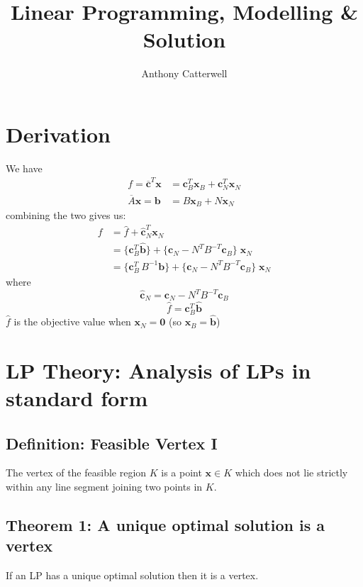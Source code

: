 \documentclass[11pt,a4paper]{article}
\title{Linear Programming, Modelling \& Solution}
\author{Anthony Catterwell}
\begin{document}
\maketitle


\section*{Derivation}
We have
\begin{align*}{}
    f = \overline{\textbf{c}}^{T}\textbf{x} &=
    \textbf{c}_B^T \textbf{x}_B + \textbf{c}_N^T \textbf{x}_N \\
    \overline{A}\textbf{x} = \textbf{b} &= B\textbf{x}_B + N\textbf{x}_N
\end{align*}
combining the two gives us:
\begin{align*}{}
    f &= \widehat{f} + \widehat{\textbf{c}}_N^T \textbf{x}_N \\
      &= \{ \textbf{c}^T_B \widehat{\textbf{b}} \} +
      \{ \textbf{c}_N - N^T B^{-T} \textbf{c}_B \} \; \textbf{x}_N \\
      &= \{ \textbf{c}_B^T \, B^{-1}\textbf{b} \} +
      \{ \textbf{c}_N - N^T B^{-T} \textbf{c}_B \} \; \textbf{x}_N
\end{align*}
where
\[
    \widehat{\textbf{c}}_N = \textbf{c}_N - {N^T} {B^{-T}} \textbf{c}_B
\]
\[
    \widehat{f} = \textbf{c}_B^T\widehat{\textbf{b}}
\]
$\widehat{f}$ is the objective value when $\textbf{x}_N = \textbf{0}$
(so $\textbf{x}_B = \widehat{\textbf{b}}$)\\

\section*{LP Theory: Analysis of LPs in standard form}

\subsection*{Definition: Feasible Vertex I}
The vertex of the feasible region $K$ is a point $\textbf{x} \in K$ which does not lie strictly
within any line segment joining two points in $K$.

\subsection*{Theorem 1: A unique optimal solution is a vertex}
If an LP has a unique optimal solution then it is a vertex.
\end{document}
